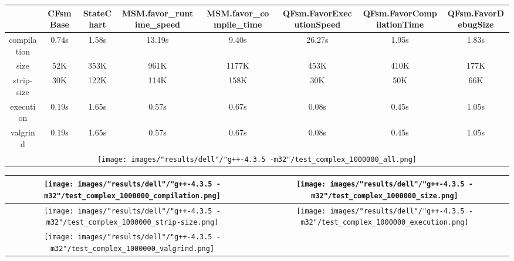 \begin{landscape}
\begin{table}
\caption{"dell" [df6407d], g++-4.3.5 -m32/test complex 1000000}
\centering
\begin{longtable}{| c | c |c |c |c |c |c |c |}
\hline
& CFsmBase& StateChart& MSM.favor\_runtime\_speed& MSM.favor\_compile\_time& QFsm.FavorExecutionSpeed& QFsm.FavorCompilationTime& QFsm.FavorDebugSize\\
\hline
compilation & 0.74s & 1.58s & 13.19s & 9.40s & 26.27s & 1.95s & 1.83s\\
\hline
size & 52K & 353K & 961K & 1177K & 453K & 410K & 177K\\
\hline
strip-size & 30K & 122K & 114K & 158K & 30K & 50K & 66K\\
\hline
execution & 0.19s & 1.65s & 0.57s & 0.67s & 0.08s & 0.45s & 1.05s\\
\hline
valgrind & 0.19s & 1.65s & 0.57s & 0.67s & 0.08s & 0.45s & 1.05s\\
\hline
\multicolumn{8}{|c|}{\texttt{[image: images/"results/dell"/"g++-4.3.5 -m32"/test\_complex\_1000000\_all.png]}}\\
\hline
\end{longtable}
\end{table}
\end{landscape}
\newpage
\begin{table}
\centering
\begin{longtable}{| c | c |}
\hline
\texttt{[image: images/"results/dell"/"g++-4.3.5 -m32"/test\_complex\_1000000\_compilation.png]}& \texttt{[image: images/"results/dell"/"g++-4.3.5 -m32"/test\_complex\_1000000\_size.png]}\\
\hline
\texttt{[image: images/"results/dell"/"g++-4.3.5 -m32"/test\_complex\_1000000\_strip-size.png]}& \texttt{[image: images/"results/dell"/"g++-4.3.5 -m32"/test\_complex\_1000000\_execution.png]}\\
\hline
\texttt{[image: images/"results/dell"/"g++-4.3.5 -m32"/test\_complex\_1000000\_valgrind.png]}& \\ \hline
\end{longtable}
\end{table}
